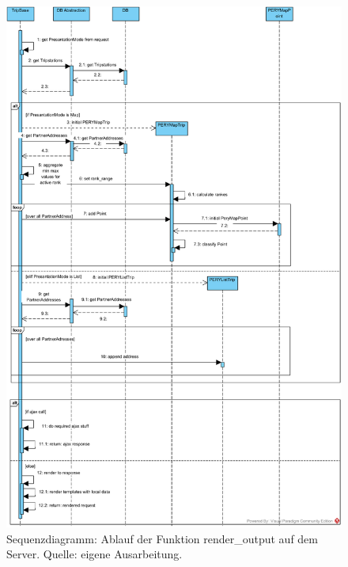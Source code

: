 \documentclass[Bachelorarbeit.tex]{subfiles}
\begin{document}
\begin{figure}[h]
\centering
\includegraphics[width=1\linewidth]{img/Implementierung/renderOutput}
\caption[k]{Sequenzdiagramm: Ablauf der Funktion render\_output auf dem Server. Quelle: eigene Ausarbeitung.}
\label{fig:renderOutput}
\end{figure}
\end{document}
